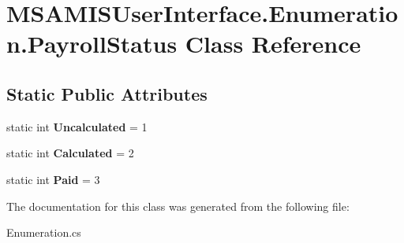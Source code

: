 \hypertarget{class_m_s_a_m_i_s_user_interface_1_1_enumeration_1_1_payroll_status}{}\section{M\+S\+A\+M\+I\+S\+User\+Interface.\+Enumeration.\+Payroll\+Status Class Reference}
\label{class_m_s_a_m_i_s_user_interface_1_1_enumeration_1_1_payroll_status}
\subsection*{Static Public Attributes}
\begin{DoxyCompactItemize}
\item 
\mbox{\label{class_m_s_a_m_i_s_user_interface_1_1_enumeration_1_1_payroll_status_ae08d2d0e2f630bedd9251b1939f18695}} 
static int {\bfseries Uncalculated} = 1
\item 
\mbox{\label{class_m_s_a_m_i_s_user_interface_1_1_enumeration_1_1_payroll_status_a84a6645add1b608c813903565a9a4872}} 
static int {\bfseries Calculated} = 2
\item 
\mbox{\label{class_m_s_a_m_i_s_user_interface_1_1_enumeration_1_1_payroll_status_a67a06c8b72bf65cc01d9468935ea1d8b}} 
static int {\bfseries Paid} = 3
\end{DoxyCompactItemize}


The documentation for this class was generated from the following file\+:\begin{DoxyCompactItemize}
\item 
Enumeration.\+cs\end{DoxyCompactItemize}
